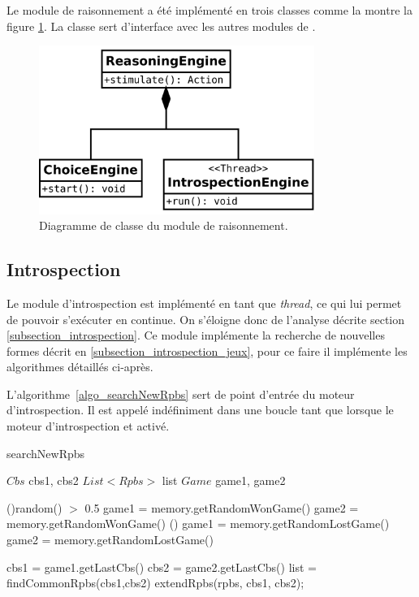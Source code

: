 
Le module de raisonnement a été implémenté en trois classes comme la montre la figure \ref{class_diag_reasoning_engine}. La classe  sert d'interface avec les autres modules de \cogito{}. 

\begin{figure}[H] 
\center
\includegraphics[width=0.8\textwidth]{files/class_diagram/reasoningEngine} 
\caption{Diagramme de classe du module de raisonnement.}
\label{class_diag_reasoning_engine}
\end{figure}

\subsection{Introspection}


Le module d'introspection est implémenté en tant que \emph{thread}, ce qui lui permet de pouvoir s'exécuter en continue. On s'éloigne donc de l'analyse décrite section \vref{subsection_introspection}. Ce module implémente la recherche de nouvelles formes décrit en \vref{subsection_introspection_jeux}, pour ce faire il implémente les algorithmes détaillés ci-après.


L'algorithme~\vref{algo_searchNewRpbs} sert de point d'entrée du moteur d'introspection. Il est appelé indéfiniment dans une boucle \og tant que \fg{} lorsque le moteur d'introspection et activé.


\begin{algorithm}[H]
	\caption{searchNewRpbs}
	\label{algo_searchNewRpbs}
  \vspace{0.2cm}
  
	$Cbs$ cbs1, cbs2\;
	$List<Rpbs>$ list\;	
	$Game$ game1, game2\;
	
	\eIf(){random() $>$ 0.5}
		{
			game1 = memory.getRandomWonGame()\;
			{
				game2 = memory.getRandomWonGame()\;
			}
		}()
		{
			game1 = memory.getRandomLostGame()\;
			{
				game2 = memory.getRandomLostGame()\;
			}
		}
  \vspace{0.2cm}
  
	cbs1 = game1.getLastCbs()\;
	cbs2 = game2.getLastCbs()\;
		{ 
			list = findCommonRpbs(cbs1,cbs2)\;
			{
				extendRpbs(rpbs, cbs1, cbs2);
			}
		}
		
\end{algorithm}

